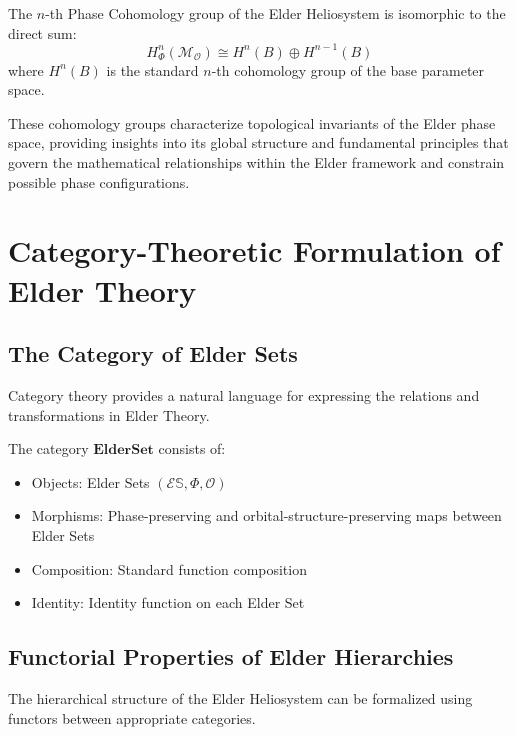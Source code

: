 \begin{theorem}
The $n$-th Phase Cohomology group of the Elder Heliosystem is isomorphic to the direct sum:
\begin{equation}
H^n_{\Phi}(\mathcal{M}_{\mathcal{O}}) \cong H^n(B) \oplus H^{n-1}(B)
\end{equation}
where $H^n(B)$ is the standard $n$-th cohomology group of the base parameter space.
\end{theorem}

These cohomology groups characterize topological invariants of the Elder phase space, providing insights into its global structure and fundamental principles that govern the mathematical relationships within the Elder framework and constrain possible phase configurations.

\section{Category-Theoretic Formulation of Elder Theory}

\subsection{The Category of Elder Sets}

Category theory provides a natural language for expressing the relations and transformations in Elder Theory.

\begin{definition}
The category $\mathbf{ElderSet}$ consists of:
\begin{itemize}
    \item Objects: Elder Sets $(\mathcal{E}\mathbb{S}, \Phi, \mathcal{O})$
    \item Morphisms: Phase-preserving and orbital-structure-preserving maps between Elder Sets
    \item Composition: Standard function composition
    \item Identity: Identity function on each Elder Set
\end{itemize}
\end{definition}

\subsection{Functorial Properties of Elder Hierarchies}

The hierarchical structure of the Elder Heliosystem can be formalized using functors between appropriate categories.

